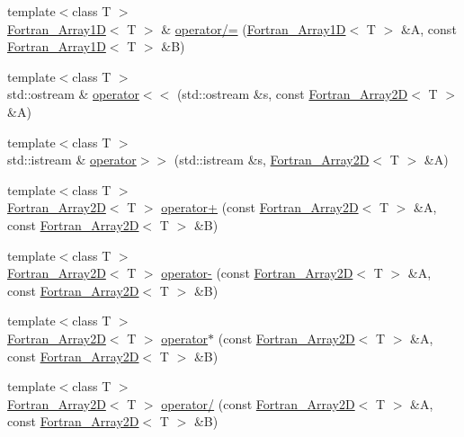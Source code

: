 \begin{DoxyCompactItemize}
\item 
{\footnotesize template$<$class T $>$ }\\\hyperlink{classTNT_1_1Fortran__Array1D}{Fortran\-\_\-\-Array1\-D}$<$ T $>$ \& \hyperlink{namespaceTNT_a5b2a88a1bcf57a7d02daad176c4e79a0}{operator/=} (\hyperlink{classTNT_1_1Fortran__Array1D}{Fortran\-\_\-\-Array1\-D}$<$ T $>$ \&A, const \hyperlink{classTNT_1_1Fortran__Array1D}{Fortran\-\_\-\-Array1\-D}$<$ T $>$ \&B)
\item 
{\footnotesize template$<$class T $>$ }\\std\-::ostream \& \hyperlink{namespaceTNT_a4b4db3071f96be25b2b8f58aa642e14b}{operator$<$$<$} (std\-::ostream \&s, const \hyperlink{classTNT_1_1Fortran__Array2D}{Fortran\-\_\-\-Array2\-D}$<$ T $>$ \&A)
\item 
{\footnotesize template$<$class T $>$ }\\std\-::istream \& \hyperlink{namespaceTNT_a593c4004ec093777d00ecaa7b18ec8ac}{operator$>$$>$} (std\-::istream \&s, \hyperlink{classTNT_1_1Fortran__Array2D}{Fortran\-\_\-\-Array2\-D}$<$ T $>$ \&A)
\item 
{\footnotesize template$<$class T $>$ }\\\hyperlink{classTNT_1_1Fortran__Array2D}{Fortran\-\_\-\-Array2\-D}$<$ T $>$ \hyperlink{namespaceTNT_a3838bc6cf71174487152b0bbebf2fa9a}{operator+} (const \hyperlink{classTNT_1_1Fortran__Array2D}{Fortran\-\_\-\-Array2\-D}$<$ T $>$ \&A, const \hyperlink{classTNT_1_1Fortran__Array2D}{Fortran\-\_\-\-Array2\-D}$<$ T $>$ \&B)
\item 
{\footnotesize template$<$class T $>$ }\\\hyperlink{classTNT_1_1Fortran__Array2D}{Fortran\-\_\-\-Array2\-D}$<$ T $>$ \hyperlink{namespaceTNT_a556e2242e5f6a09cc7240a3d544a0149}{operator-\/} (const \hyperlink{classTNT_1_1Fortran__Array2D}{Fortran\-\_\-\-Array2\-D}$<$ T $>$ \&A, const \hyperlink{classTNT_1_1Fortran__Array2D}{Fortran\-\_\-\-Array2\-D}$<$ T $>$ \&B)
\item 
{\footnotesize template$<$class T $>$ }\\\hyperlink{classTNT_1_1Fortran__Array2D}{Fortran\-\_\-\-Array2\-D}$<$ T $>$ \hyperlink{namespaceTNT_a8a02ca89f6e9ca34b3061f20d4d36458}{operator$\ast$} (const \hyperlink{classTNT_1_1Fortran__Array2D}{Fortran\-\_\-\-Array2\-D}$<$ T $>$ \&A, const \hyperlink{classTNT_1_1Fortran__Array2D}{Fortran\-\_\-\-Array2\-D}$<$ T $>$ \&B)
\item 
{\footnotesize template$<$class T $>$ }\\\hyperlink{classTNT_1_1Fortran__Array2D}{Fortran\-\_\-\-Array2\-D}$<$ T $>$ \hyperlink{namespaceTNT_adab9ec5a320edda78d7c70db1962b53c}{operator/} (const \hyperlink{classTNT_1_1Fortran__Array2D}{Fortran\-\_\-\-Array2\-D}$<$ T $>$ \&A, const \hyperlink{classTNT_1_1Fortran__Array2D}{Fortran\-\_\-\-Array2\-D}$<$ T $>$ \&B)

\end{DoxyCompactItemize}
